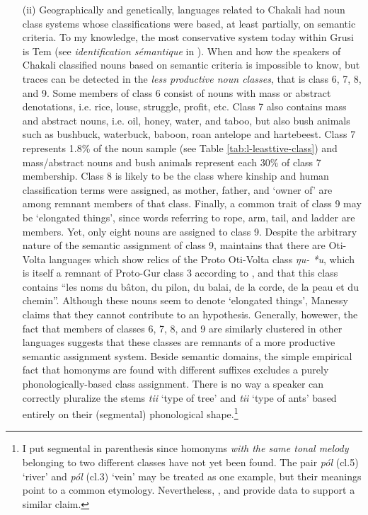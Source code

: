 \begin{exe}
\begin{exe}
\begin{exe}
{\begin{exe}
\begin{exe}
\begin{exe}
\begin{exe}
\begin{enumerate}
 \item[(ii)]
Geographically and genetically, languages related to Chakali had noun class
systems whose classifications were based, at least partially, on semantic
criteria. To my knowledge, the most conservative system today  within Grusi is
Tem (see {\it identification sémantique} in \citet{Tcha07}). When and how the
speakers of Chakali  classified nouns based on semantic criteria is impossible
to know,  but traces can be detected in  the   {\it less productive noun
classes}, that is class 6, 7, 8, and 9.
Some members of class 6 consist of
nouns with mass or abstract  denotations, i.e. rice,  louse, struggle, profit,
etc.  Class 7 also contains mass and abstract nouns, i.e. oil,  honey, water, 
and
 taboo, but also bush animals such as bushbuck, waterbuck, baboon, roan
antelope and hartebeest. Class 7 represents 1.8\% of the noun sample
(see Table \ref{tab:l-leasttive-class}) and  mass/abstract nouns and bush
animals
represent each  
30\% of class 7 membership. Class 8 is likely to be the class where kinship and 
human
classification terms were assigned, 
as
mother, father, and `owner of' are among
remnant
members of that class.  Finally, a  common trait of class 9 may be
`elongated things', since words referring to  rope, arm, tail, and ladder are
members. Yet, only eight nouns are
assigned to class 9. Despite the arbitrary nature of the semantic
assignment of class 9,  \citet[94]{Mane75} maintains that there are Oti-Volta
languages which show relics of  the Proto Oti-Volta class {\it *ŋu- *u},
which is  itself a remnant of Proto-Gur class 3   according to
\citet[11]{Mieh07}, and that this class contains ``les noms du bâton, du pilon,
du balai, de la corde, de la peau et du chemin''.  Although these nouns seem
to
 denote `elongated  things',   Manessy claims that they cannot contribute to
an hypothesis. Generally, howewer, the fact that members of classes 6, 7, 8, and
9 are
similarly clustered in other languages suggests that these classes are remnants
of a more productive semantic assignment system. %
Beside semantic
domains, the simple empirical fact that homonyms are found with
different suffixes excludes a purely phonologically-based class assignment.
There is no way a speaker can correctly pluralize the stems {\it tii} `type of
tree' and {\it tii} `type of ants' based entirely on their (segmental)
phonological shape.\footnote{I put segmental in parenthesis since  homonyms {\it
with the same tonal melody} belonging to two different
classes have not yet been  found. The pair {\it pól} ({\sc cl.5}) `river' and
{\it pól}
({\sc cl.3}) 
`vein' may be treated as one example, but their meanings point to a
common etymology. Nevertheless, \citet{Bonv88}, \citet{Awed07} and 
\citet{Tcha07}
provide data to support a similar claim.} 
 


\end{enumerate}
\end{exe}
\end{exe}
\end{exe}
\end{exe}}
\end{exe}
\end{exe}
\end{exe}
